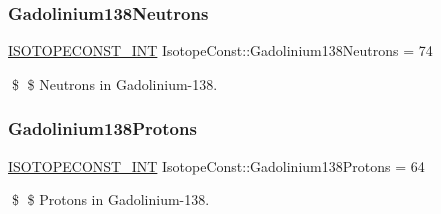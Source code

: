 \subsubsection{\texorpdfstring{Gadolinium138\+Neutrons}{Gadolinium138Neutrons}}
{\footnotesize\ttfamily \mbox{\hyperlink{group___isotope_const-_macros_ga5f18360b3e99483a35c32d789e62621c}{I\+S\+O\+T\+O\+P\+E\+C\+O\+N\+S\+T\+\_\+\+I\+NT}} Isotope\+Const\+::\+Gadolinium138\+Neutrons = 74}

\$ \$ Neutrons in Gadolinium-\/138. \mbox{\label{group___isotope_const-_gadolinium-_gd138_ga10932b5c2912c2225927899e24e55c6a}} 
\subsubsection{\texorpdfstring{Gadolinium138\+Protons}{Gadolinium138Protons}}
{\footnotesize\ttfamily \mbox{\hyperlink{group___isotope_const-_macros_ga5f18360b3e99483a35c32d789e62621c}{I\+S\+O\+T\+O\+P\+E\+C\+O\+N\+S\+T\+\_\+\+I\+NT}} Isotope\+Const\+::\+Gadolinium138\+Protons = 64}

\$ \$ Protons in Gadolinium-\/138. 
